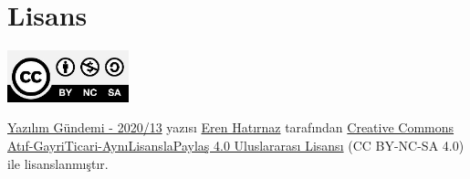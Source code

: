 \documentclass[11pt]{article}
\begin{document}
\section{Lisans}
\label{sec:orgdafaa76}
\begin{center}
\begin{center}
\includegraphics[height=1.5cm]{../../../img/CC_BY-NC-SA_4.0.png}
\end{center}

\href{yazilim-gundemi-2020-13.pdf}{Yazılım Gündemi - 2020/13} yazısı \href{https://erenhatirnaz.github.io}{Eren Hatırnaz} tarafından \href{http://creativecommons.org/licenses/by-nc-sa/4.0/}{Creative Commons
Atıf-GayriTicari-AynıLisanslaPaylaş 4.0 Uluslararası Lisansı} (CC BY-NC-SA 4.0)
ile lisanslanmıştır.
\end{center}
\end{document}
